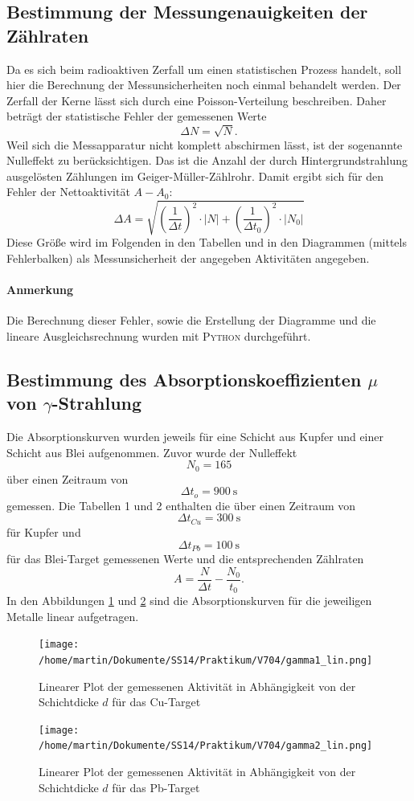\documentclass[11pt,ngerman,a4paper]{article}
\begin{document}
\subsection{Bestimmung der Messungenauigkeiten der Zählraten}
Da es sich beim radioaktiven Zerfall um einen statistischen Prozess handelt, soll hier die Berechnung der Messunsicherheiten noch einmal behandelt werden. Der Zerfall der Kerne lässt sich durch eine Poisson-Verteilung beschreiben. Daher beträgt der statistische Fehler der gemessenen Werte
\begin{equation}
\Delta N = \sqrt{N}.
\end{equation} 
Weil sich die Messapparatur nicht komplett abschirmen lässt, ist der sogenannte Nulleffekt zu berücksichtigen. Das ist die Anzahl der durch Hintergrundstrahlung ausgelösten Zählungen im Geiger-Müller-Zählrohr. Damit ergibt sich für den Fehler der Nettoaktivität $A-A_0$:
\begin{equation}
\Delta A = \sqrt{\left(\frac1{\Delta t}\right)^2 \cdot |N| +\left(\frac1{\Delta t_0}\right)^2 \cdot |N_0| }
\end{equation} 
Diese Größe wird im Folgenden in den Tabellen und in den Diagrammen (mittels Fehlerbalken) als Messunsicherheit der angegeben Aktivitäten angegeben. 
\paragraph{Anmerkung} Die Berechnung dieser Fehler, sowie die Erstellung der Diagramme und die lineare Ausgleichsrechnung wurden mit \textsc{Python} durchgeführt.  
\subsection{Bestimmung des Absorptionskoeffizienten $\mu$ von $\gamma$-Strahlung}
Die Absorptionskurven wurden jeweils für eine Schicht aus Kupfer und einer Schicht aus Blei aufgenommen. Zuvor wurde der Nulleffekt 
\[
N_0 = 165
\]
über einen Zeitraum von
\[
\Delta t_o = \SI{900}{\second}
\]
gemessen.
Die Tabellen 1 und 2 enthalten die über einen Zeitraum von 
\[
\Delta t_{Cu} = \SI{300}{\second}
\]
für Kupfer und
\[
\Delta t_{Pb} = \SI{100}{\second}
\]
für das Blei-Target gemessenen Werte und die entsprechenden Zählraten
\[
A = \frac{N}{\Delta t} - \frac{N_0}{t_0}.
\]
In den Abbildungen \ref{abb_gamma1_lin} und \ref{abb_gamma2_lin} sind die Absorptionskurven für die jeweiligen Metalle linear aufgetragen. 
\begin{figure}[H]
\centering
\texttt{[image: /home/martin/Dokumente/SS14/Praktikum/V704/gamma1\_lin.png]}
\caption{Linearer Plot der gemessenen Aktivität in Abhängigkeit von der Schichtdicke $d$ für das Cu-Target}
\label{abb_gamma1_lin}
\end{figure}
\begin{figure}[H]
\centering
\texttt{[image: /home/martin/Dokumente/SS14/Praktikum/V704/gamma2\_lin.png]}
\caption{Linearer Plot der gemessenen Aktivität in Abhängigkeit von der Schichtdicke $d$ für das Pb-Target}
\label{abb_gamma2_lin}
\end{figure}
\end{document}
